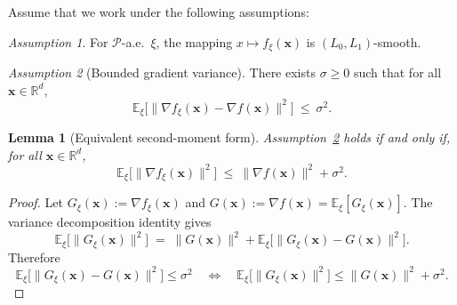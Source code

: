 \documentclass[twoside]{article}
\theoremstyle{plain}
\newtheorem{lemma}{Lemma}[section]
\theoremstyle{definition}
\theoremstyle{remark}
\newtheorem{assumption}{Assumption}
\def\vx{{\bm{x}}}
\begin{document}
Assume that we work under the following assumptions:


\begin{assumption}\label{ass:smooth_ind}
For $\mathcal{P}$-a.e.\ $\xi$, the mapping $x \mapsto f_{\xi}(\vx)$ is 
$(L_0, L_1)$-smooth.
\end{assumption}

\begin{assumption}[Bounded gradient variance]\label{ass:var_bound}
There exists $\sigma \ge 0$ such that for all $\vx \in \mathbb{R}^d$,
\[
  \mathbb{E}_\xi\!\big[\|\nabla f_{\xi}(\vx)-\nabla f(\vx)\|^2\big]\ \le\ \sigma^2 .
\]
\end{assumption}

\begin{propbox}
\begin{lemma}[Equivalent second-moment form]\label{lem:second_moment_equiv}
Assumption~\ref{ass:var_bound} holds if and only if, for all $\vx \in \mathbb{R}^d$,
\[
  \mathbb{E}_\xi\!\big[\|\nabla f_{\xi}(\vx)\|^2\big]\ \le\ \|\nabla f(\vx)\|^2 + \sigma^2 .
\]
\end{lemma}
\end{propbox}
\begin{proof}
Let $G_\xi(\vx):=\nabla f_\xi(\vx)$ and $G(\vx):=\nabla f(\vx)=\mathbb{E}_\xi[G_\xi(\vx)]$.
The variance decomposition identity gives
\[
  \mathbb{E}_\xi\!\big[\|G_\xi(\vx)\|^2\big]
  \;=\; \|G(\vx)\|^2 + \mathbb{E}_\xi\!\big[\|G_\xi(\vx)-G(\vx)\|^2\big].
\]
Therefore
\[
  \mathbb{E}_\xi\!\big[\|G_\xi(\vx)-G(\vx)\|^2\big]\le \sigma^2
  \quad\Longleftrightarrow\quad
  \mathbb{E}_\xi\!\big[\|G_\xi(\vx)\|^2\big]\le \|G(\vx)\|^2+\sigma^2.
\]
\end{proof}
\end{document}
